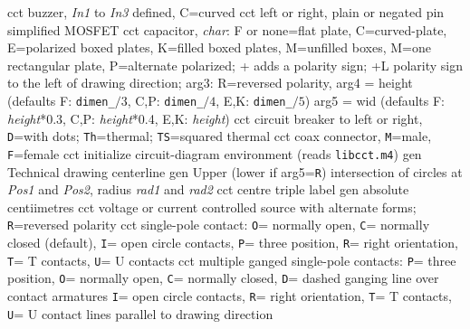   {cct}
  {buzzer, {\sl In1} to {\sl In3} defined, C=curved
   }
%
  {cct}
  {left or right, plain or negated pin simplified MOSFET}
  {cct}
  {capacitor, {\sl char}: F or none=flat plate, C=curved-plate,
    E=polarized boxed plates,
    K=filled boxed plates,
    M=unfilled boxes,
    M=one rectangular plate,
    P=alternate polarized; + adds a polarity sign;
    +L polarity sign to the left of drawing direction;
    arg3:  R=reversed polarity,
    arg4 = height (defaults F: {\tt dimen\_}$/3$,
      C,P: {\tt dimen\_}$/4$, E,K: {\tt dimen\_}$/5$)
    arg5 = wid (defaults F: {\sl height}*0.3,
      C,P: {\sl height}*0.4, E,K: {\sl height}) }
  {cct}
  {circuit breaker to left or right, {\tt D}=with dots; {\tt Th}=thermal;
   {\tt TS}=squared thermal}
  {cct}
  {coax connector, {\tt M}=male, {\tt F}=female
    }
  {cct}
  {initialize circuit-diagram environment (reads {\tt libcct.m4})}
  {gen}
  {Technical drawing centerline}
  {gen}
  {Upper (lower if arg5={\tt R}) intersection of circles at
    {\sl Pos1} and {\sl Pos2}, radius {\sl rad1} and {\sl rad2}}
  {cct}
  {centre triple label }
  {gen}
  {absolute centiimetres}
  {cct}
  {voltage or current controlled source with alternate forms;
   {\tt R}=reversed polarity}
  {cct}
  {single-pole contact:
   {\tt O}= normally open,
   {\tt C}= normally closed (default),
   {\tt I}= open circle contacts,
   {\tt P}= three position,
   {\tt R}= right orientation,
   {\tt T}= T contacts,
   {\tt U}= U contacts
   }
  {cct}
  {multiple ganged single-pole contacts:
   {\tt P}= three position,
   {\tt O}= normally open,
   {\tt C}= normally closed,
   {\tt D}= dashed ganging line over contact armatures
   {\tt I}= open circle contacts,
   {\tt R}= right orientation,
   {\tt T}= T contacts,
   {\tt U}= U contact lines parallel to drawing direction
   }
